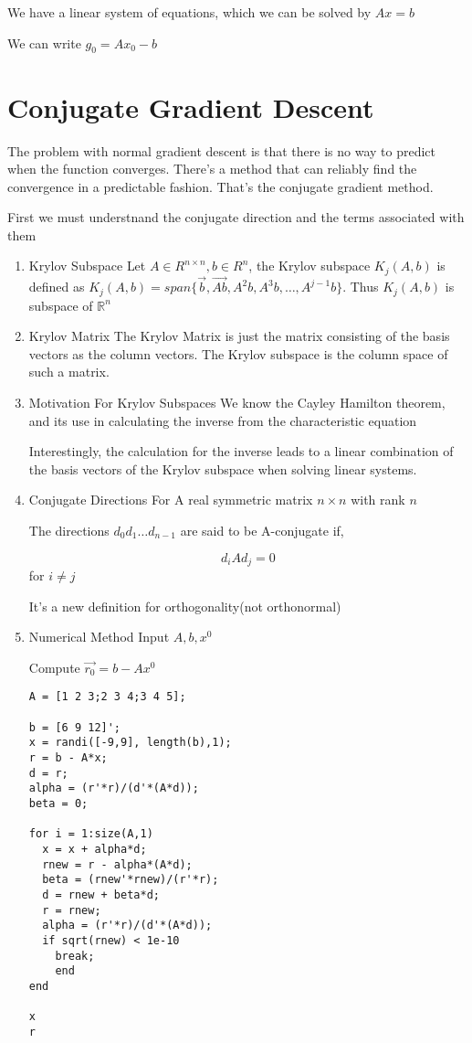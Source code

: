 \documentclass[11pt]{report}
\begin{document}
We have a linear system of equations, which we can be solved by \(Ax=b\)

We can write \(g_0 = Ax_{0} - b\)
\section{Conjugate Gradient Descent}
\label{sec:orgb882b3a}
The problem with normal gradient descent is that there is no way to predict when the function converges. There's a method that can reliably find the convergence in a predictable fashion. That's the conjugate gradient method.

First we must understnand the conjugate direction and the terms associated with them
\begin{enumerate}
\item Krylov Subspace
\label{sec:org5201a9d}
Let \(A \in R^{n \times n}, b \in R^n\), the Krylov subspace \(K_j(A,b)\) is defined as \(K_j(A,b) = span \{\vec{b}, \vec{Ab}, A^2b, A^3b, \dots , A^{j-1}b\}\). Thus \(K_j(A,b)\) is subspace of \(\mathbb{R}^n\)
\item Krylov Matrix
\label{sec:org721794e}
The Krylov Matrix is just the matrix consisting of the basis vectors as the column vectors. The Krylov subspace is the column space of such a matrix.
\item Motivation For Krylov Subspaces
\label{sec:org6cf99e7}
We know the Cayley Hamilton theorem, and its use in calculating the inverse from the characteristic equation

Interestingly, the calculation for the inverse leads to a linear combination of the basis vectors of the Krylov subspace when solving linear systems.
\item Conjugate Directions
\label{sec:orgba0c6e1}
For A real symmetric matrix \(n \times n\) with rank \(n\)

The directions \(d_0 d_1 \dots d_{n-1}\) are said to be A-conjugate if,

$$d_i Ad_j = 0 $$ for \(i \neq j\)

It's a new definition for orthogonality(not orthonormal)
\item Numerical Method
\label{sec:orgb37da9b}
Input \(A,b,x^{0}\)

Compute \(\vec{r_{0}} = b - A x^0\)
\begin{verbatim}
A = [1 2 3;2 3 4;3 4 5];

b = [6 9 12]';
x = randi([-9,9], length(b),1);
r = b - A*x;
d = r;
alpha = (r'*r)/(d'*(A*d));
beta = 0;

for i = 1:size(A,1)
  x = x + alpha*d;
  rnew = r - alpha*(A*d);
  beta = (rnew'*rnew)/(r'*r);
  d = rnew + beta*d;
  r = rnew;
  alpha = (r'*r)/(d'*(A*d));
  if sqrt(rnew) < 1e-10
    break;
    end
end

x
r
\end{verbatim}
\end{enumerate}
\end{document}
